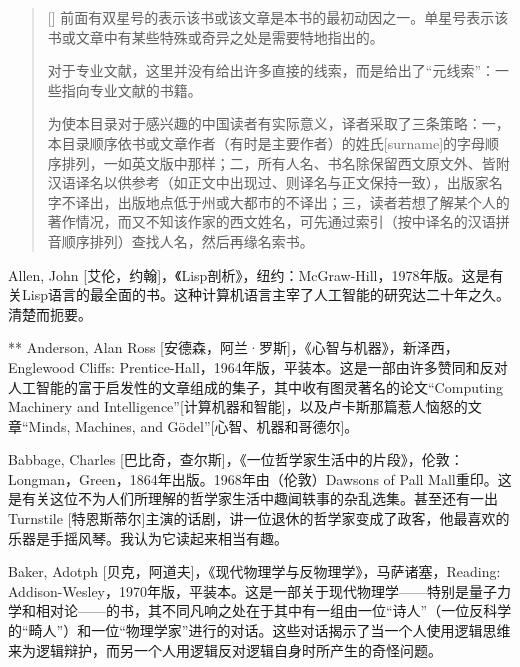 
\begin{thebib}

\begin{quotation}[\small]
前面有双星号的表示该书或该文章是本书的最初动因之一。单星号表示该书或文章中有某些特殊或奇异之处是需要特地指出的。

对于专业文献，这里并没有给出许多直接的线索，而是给出了“元线索”：一些指向专业文献的书籍。

为使本目录对于感兴趣的中国读者有实际意义，译者采取了三条策略：一，本目录顺序依书或文章作者（有时是主要作者）的姓氏[surname]的字母顺序排列，一如英文版中那样；二，所有人名、书名除保留西文原文外、皆附汉语译名以供参考（如正文中出现过、则译名与正文保持一致），出版家名字不译出，出版地点低于州或大都市的不译出；三，读者若想了解某个人的著作情况，而又不知该作家的西文姓名，可先通过索引（按中译名的汉语拼音顺序排列）查找人名，然后再缘名索书。
\end{quotation}

\begin{biblist}

\item Allen, John [艾伦，约翰]，《Lisp剖析》，纽约：McGraw-Hill，1978年版。这是有关Lisp语言的最全面的书。这种计算机语言主宰了人工智能的研究达二十年之久。清楚而扼要。

\item[**] Anderson, Alan Ross [安德森，阿兰·罗斯]，《心智与机器》，新泽西，Englewood Cliffs: Prentice-Hall，1964年版，平装本。这是一部由许多赞同和反对人工智能的富于启发性的文章组成的集子，其中收有图灵著名的论文“Computing Machinery and Intelligence”[计算机器和智能]，以及卢卡斯那篇惹人恼怒的文章“Minds, Machines, and Gödel”[心智、机器和哥德尔]。

\item Babbage, Charles [巴比奇，查尔斯]，《一位哲学家生活中的片段》，伦敦：Longman，Green，1864年出版。1968年由（伦敦）Dawsons of Pall Mall重印。这是有关这位不为人们所理解的哲学家生活中趣闻轶事的杂乱选集。甚至还有一出Turnstile [特恩斯蒂尔]主演的话剧，讲一位退休的哲学家变成了政客，他最喜欢的乐器是手摇风琴。我认为它读起来相当有趣。

\item Baker, Adotph [贝克，阿道夫]，《现代物理学与反物理学》，马萨诸塞，Reading: Addison-Wesley，1970年版，平装本。这是一部关于现代物理学——特别是量子力学和相对论——的书，其不同凡响之处在于其中有一组由一位“诗人”（一位反科学的“畸人”）和一位“物理学家”进行的对话。这些对话揭示了当一个人使用逻辑思维来为逻辑辩护，而另一个人用逻辑反对逻辑自身时所产生的奇怪问题。


\end{biblist}
\end{thebib}
